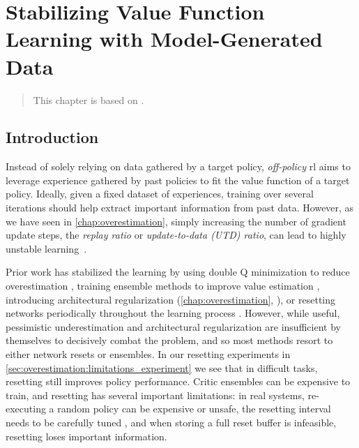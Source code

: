 \chapter{Stabilizing Value Function Learning with Model-Generated Data}
\label{chap:mad}

\begin{quote}
    This chapter is based on .
\end{quote}


\newcommand{\blue}[1]{{\color{uoftoceanblue} #1}}
\newcommand{\red}[1]{{\color{uoftred} #1}}

\section{Introduction}

Instead of solely relying on data gathered by a target policy, \emph{off-policy} \ac{rl} aims to leverage experience gathered by past policies \parencite{suttonbook} to fit the value function of a target policy. 
Ideally, given a fixed dataset of experiences, training over several iterations should help extract important information from past data.
However, as we have seen in \autoref{chap:overestimation}, simply increasing the number of gradient update steps, the \emph{replay ratio} or \emph{update-to-data (UTD) ratio}, can lead to highly unstable learning~\parencite{nikishin2022primacy,doro2023barrier,hussing2024dissecting,nauman2024bigger}.

Prior work has stabilized the learning by using double Q minimization to reduce overestimation \parencite{fujimoto2018addressing}, training ensemble methods to improve value estimation \parencite{chen2021randomized,hiraoka2022dropout}, introducing architectural regularization (\autoref{chap:overestimation}, \textcite{hussing2024dissecting,nauman2024bigger}), or resetting networks periodically throughout the learning process \parencite{doro2023barrier,schwarzer2023bigger,nauman2024bigger}.
However, while useful, pessimistic underestimation and architectural regularization are insufficient by themselves  to decisively combat the problem, and so most methods resort to either network resets or ensembles.
In our resetting experiments in \autoref{sec:overestimation:limitations_experiment} we see that in difficult tasks, resetting still improves policy performance.
Critic ensembles can be expensive to train, and resetting has several important limitations: in real systems, re-executing a random policy can be expensive or unsafe, the resetting interval needs to be carefully tuned \parencite{hussing2024dissecting}, and when storing a full reset buffer is infeasible, resetting loses important information.

